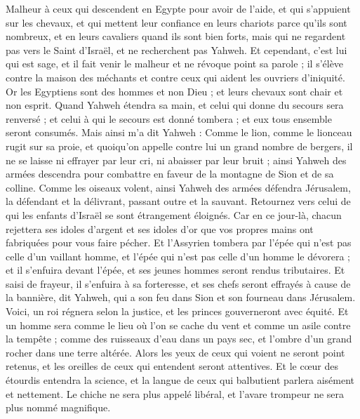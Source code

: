 \begin{multicols}{2}
\VerseOne{}Malheur à ceux qui descendent en Egypte pour avoir de l'aide, et qui s'appuient sur les chevaux, et qui mettent leur confiance en leurs chariots parce qu'ils sont nombreux, et en leurs cavaliers quand ils sont bien forts, mais qui ne regardent pas vers le Saint d'Israël, et ne recherchent pas Yahweh.
Et cependant, c'est lui qui est sage, et il fait venir le malheur et ne révoque point sa parole ; il s'élève contre la maison des méchants et contre ceux qui aident les ouvriers d'iniquité.
Or les Egyptiens sont des hommes et non Dieu ; et leurs chevaux sont chair et non esprit. Quand Yahweh étendra sa main, et celui qui donne du secours sera renversé ; et celui à qui le secours est donné tombera ; et eux tous ensemble seront consumés.
Mais ainsi m'a dit Yahweh : Comme le lion, comme le lionceau rugit sur sa proie, et quoiqu'on appelle contre lui un grand nombre de bergers, il ne se laisse ni effrayer par leur cri, ni abaisser par leur bruit ; ainsi Yahweh des armées descendra pour combattre en faveur de la montagne de Sion et de sa colline.
Comme les oiseaux volent, ainsi Yahweh des armées défendra Jérusalem, la défendant et la délivrant, passant outre et la sauvant.
Retournez vers celui de qui les enfants d'Israël se sont étrangement éloignés.
Car en ce jour-là, chacun rejettera ses idoles d'argent et ses idoles d'or que vos propres mains ont fabriquées pour vous faire pécher.
Et l'Assyrien tombera par l'épée qui n'est pas celle d'un vaillant homme, et l'épée qui n'est pas celle d'un homme le dévorera ; et il s'enfuira devant l'épée, et ses jeunes hommes seront rendus tributaires.
Et saisi de frayeur, il s'enfuira à sa forteresse, et ses chefs seront effrayés à cause de la bannière, dit Yahweh, qui a son feu dans Sion et son fourneau dans Jérusalem.
\VerseOne{}Voici, un roi régnera selon la justice, et les princes gouverneront avec équité.
Et un homme sera comme le lieu où l'on se cache du vent et comme un asile contre la tempête ; comme des ruisseaux d'eau dans un pays sec, et l'ombre d'un grand rocher dans une terre altérée.
Alors les yeux de ceux qui voient ne seront point retenus, et les oreilles de ceux qui entendent seront attentives.
Et le cœur des étourdis entendra la science, et la langue de ceux qui balbutient parlera aisément et nettement.
Le chiche ne sera plus appelé libéral, et l'avare trompeur ne sera plus nommé magnifique.

\end{multicols}
